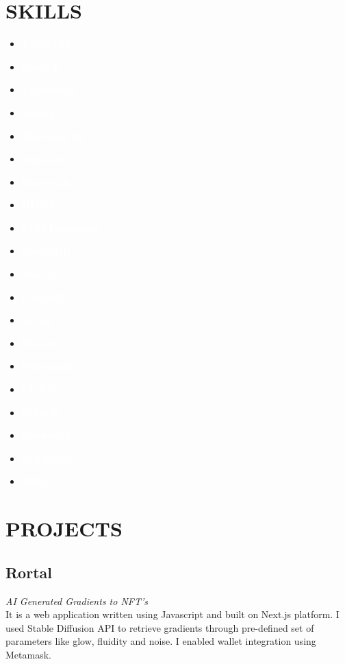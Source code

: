 \documentclass[11pt,a4paper]{article}
\newcommand{\skilltag}[1]{\textcolor{white}{\textbf{#1}}}
\begin{document}
\section{SKILLS}
\begin{center}
\begin{tcolorbox}[
    colback=bglight,
    colframe=primarygreen,
    boxrule=0.5pt,
    arc=0pt,
    width=\textwidth
]
\begin{multicols}{4}
\begin{itemize}[leftmargin=*]
    \item \skilltag{JavaScript}
    \item \skilltag{React.js}
    \item \skilltag{TypeScript}
    \item \skilltag{Node.js}
    \item \skilltag{TailwindCSS}
    \item \skilltag{Supabase}
    \item \skilltag{Express.js}
    \item \skilltag{UI/UX}
    \item \skilltag{LLM Prompting}
    \item \skilltag{MongoDB}
    \item \skilltag{Next.js}
    \item \skilltag{GraphQL}
    \item \skilltag{Vercel}
    \item \skilltag{Docker}
    \item \skilltag{Kubernetes}
    \item \skilltag{CI/CD}
    \item \skilltag{Ether.js}
    \item \skilltag{Metamask}
    \item \skilltag{NexAuth.js}
    \item \skilltag{AWS}
\end{itemize}
\end{multicols}
\end{tcolorbox}
\end{center}

\section{PROJECTS}

\subsection{Rortal}
\textit{AI Generated Gradients to NFT's}\\[0.2cm]
It is a web application written using Javascript and built on Next.js platform. I used Stable Diffusion API to retrieve gradients through pre-defined set of parameters like glow, fluidity and noise. I enabled wallet integration using Metamask.
\end{document}
